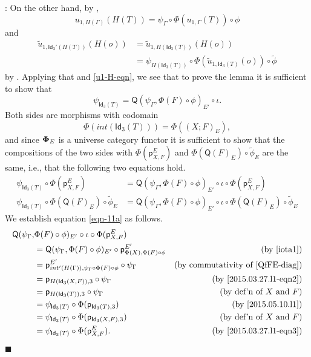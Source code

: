 \documentclass[12pt]{article}
\numberwithin{equation}{section}
\newenvironment{myproof}{{\bf Proof}:}{$\blacksquare$ \vskip 5mm }
\newcommand{\by}[1]{\text{(by #1)}}
\newcommand{\wt}{\widetilde}
\newcommand{\p}{\mathsf{p}}
\newcommand{\Idx}{\mathsf{Id}_3} %
\newcommand{\Q}{\mathsf{Q}}
\begin{document}
\begin{myproof}
On the other hand, by \cite[Lemma 6.1(1)]{fromunivwithPi},
%
$$u_{1,H(\Gamma)}(H(T))=\psi_{\Gamma}\circ \Phi(u_{1,\Gamma}(T))\circ \phi$$
and
\begin{align*}
  \wt{u}_{1,\Idx'(H(T))}(H(o))
    & = \wt{u}_{1,H(\Idx(T))}(H(o)) \\
    & = \psi_{H(\Idx(T))}\circ \Phi(\wt{u}_{1,\Idx(T)}(o))\circ \wt{\phi}
\end{align*}
%
by \cite[Lemma 6.1(1,2)]{fromunivwithPi}.  Applying that and \ref{u1-H-eqn},
we see that to prove the lemma it is sufficient to show that
%
$$\psi_{\Idx(T)}=\Q(\psi_{\Gamma},\Phi(F)\circ\phi)_{E'}\circ\iota.$$
%
Both sides are morphisms with codomain
%
$$\Phi(int(\Idx(T)))=\Phi((X;F)_E),$$
%
and since ${\bf\Phi}_E$ is a universe category functor it is sufficient to show
that the compositions of the two sides with $\Phi(\p^E_{X,F})$ and
$\Phi(\Q(F)_E)\circ \wt{\phi}_E$ are the same, i.e., that the following two equations hold.
\begin{align}
  \psi_{\Idx(T)} \circ \Phi(\p^E_{X,F})               & =\Q(\psi_{\Gamma},\Phi(F)\circ\phi)_{E'}\circ\iota \circ \Phi(\p^E_{X,F})                \label{eqn-11a} \\
  \psi_{\Idx(T)} \circ \Phi(\Q(F)_E)\circ \wt{\phi}_E & = \Q(\psi_{\Gamma},\Phi(F)\circ\phi)_{E'}\circ\iota \circ \Phi(\Q(F)_E)\circ \wt{\phi}_E \label{eqn-11b}
\end{align}
We establish equation \ref{eqn-11a} as follows.
%
\begin{align*}
        \Q(\psi_{\Gamma},&\Phi(F)\circ\phi)_{E'} \circ \iota \circ \Phi(\p^E_{X,F}) \\
    & = \Q(\psi_{\Gamma}, \Phi(F)\circ\phi)_{E'} \circ \p^{E'}_{\Phi(X),\Phi(F)\circ\phi}   & \by{\ref{iota1}} \\
    & = \p^{E'}_{int'(H(\Gamma)),\psi_{\Gamma} \circ \Phi(F)\circ\phi} \circ \psi_\Gamma    & \by{commutativity of \ref{QfFE-diag}} \\
    & = \p_{H(\Idx(X,F)),3} \circ \psi_\Gamma                                               & \by{\ref{2015.03.27.l1-eqn2}} \\
    & = \p_{H(\Idx(T)),3} \circ \psi_\Gamma                                                 & \by{def'n of $X$ and $F$} \\
    & = \psi_{\Idx(T)} \circ \Phi(\p_{\Idx(T),3})                                           & \by{\ref{2015.05.10.l1}} \\
    & = \psi_{\Idx(T)} \circ \Phi(\p_{\Idx(X,F),3})                                         & \by{def'n of $X$ and $F$} \\
    & = \psi_{\Idx(T)} \circ \Phi(\p^E_{X,F}).                                              & \by{\ref{2015.03.27.l1-eqn3}}
\end{align*}


\end{myproof}
\end{document}
